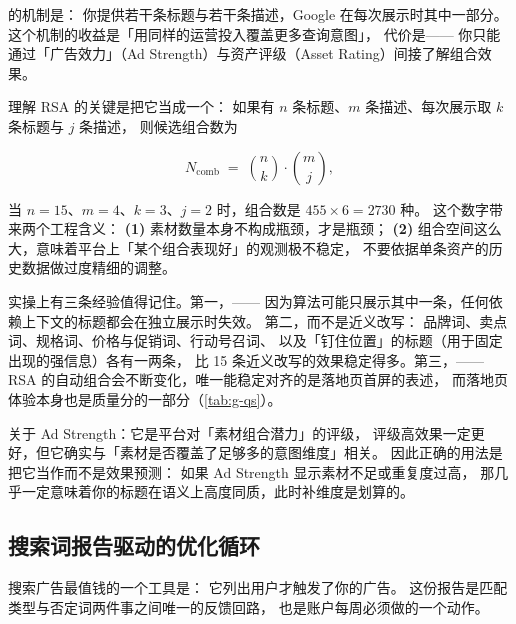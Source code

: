  的机制是：
你提供若干条标题与若干条描述，Google 在每次展示时其中一部分。
这个机制的收益是「用同样的运营投入覆盖更多查询意图」，
代价是——
你只能通过「广告效力」（Ad Strength）与资产评级（Asset Rating）间接了解组合效果。

理解 RSA 的关键是把它当成一个：
如果有 $n$ 条标题、$m$ 条描述、每次展示取 $k$ 条标题与 $j$ 条描述，
则候选组合数为

\begin{equation}
N_{\text{comb}} \;=\; \binom{n}{k} \cdot \binom{m}{j} ,
\label{eq:g-rsa-comb}
\end{equation}

当 $n=15$、$m=4$、$k=3$、$j=2$ 时，组合数是 $455 \times 6 = 2730$ 种。
这个数字带来两个工程含义：
\textbf{(1)} 素材数量本身不构成瓶颈，才是瓶颈；
\textbf{(2)} 组合空间这么大，意味着平台上「某个组合表现好」的观测极不稳定，
不要依据单条资产的历史数据做过度精细的调整。

实操上有三条经验值得记住。第一，——
因为算法可能只展示其中一条，任何依赖上下文的标题都会在独立展示时失效。
第二，而不是近义改写：
品牌词、卖点词、规格词、价格与促销词、行动号召词、
以及「钉住位置」的标题（用于固定出现的强信息）各有一两条，
比 15 条近义改写的效果稳定得多。第三，——
RSA 的自动组合会不断变化，唯一能稳定对齐的是落地页首屏的表述，
而落地页体验本身也是质量分的一部分（\cref{tab:g-qs}）。

关于 Ad Strength：它是平台对「素材组合潜力」的评级，
评级高效果一定更好，但它确实与「素材是否覆盖了足够多的意图维度」相关。
因此正确的用法是把它当作而不是效果预测：
如果 Ad Strength 显示素材不足或重复度过高，
那几乎一定意味着你的标题在语义上高度同质，此时补维度是划算的。

\subsection{搜索词报告驱动的优化循环}

搜索广告最值钱的一个工具是：
它列出用户才触发了你的广告。
这份报告是匹配类型与否定词两件事之间唯一的反馈回路，
也是账户每周必须做的一个动作。

